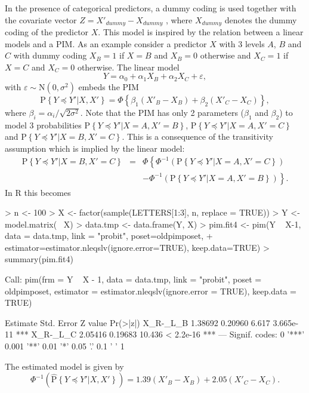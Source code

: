 \documentclass[12pt]{article}
\newcommand{\prob}[1]{\text{P}\left\{#1\right\}}
\newcommand{\hatprob}[1]{\hat{\text{P}}\left\{#1\right\}}
\newcommand{\leqs}{\preccurlyeq}
\begin{document}
In the presence of categorical predictors, a dummy coding is used together with the covariate vector $Z = X'_{dummy} - X_{dummy}$ , where $X_{dummy}$ denotes the dummy coding of the predictor $X$. This model is inspired by the relation between a linear models and a PIM. As an example consider a predictor $X$ with 3 levels $A$, $B$ and $C$ with dummy coding $X_{B} = 1$ if $X=B$ and $X_{B} = 0$ otherwise and $X_C = 1$ if $X = C$ and $X_C = 0$ otherwise. The linear model
\[
Y = \alpha_0 + \alpha_1 X_B + \alpha_2 X_C + \varepsilon,
\] 
with $\varepsilon \sim \text{N}(0,\sigma^2)$ embeds the PIM
\[
\prob{Y \leqs Y'| X, X'} = \Phi\left\{\beta_1 (X'_B - X_B) + \beta_2 (X'_C - X_C) \right\},
\]
where $\beta_i = \alpha_i/\sqrt{2 \sigma^2}$. Note that the PIM has only 2 parameters ($\beta_1$ and $\beta_2$) to model 3 probabilities $\prob{Y \leqs Y'| X = A, X' = B}$, $\prob{Y \leqs Y'| X = A, X' = C}$ and $\prob{Y \leqs Y'| X = B, X' = C}$. This is a consequence of the transitivity assumption which is implied by the linear model:
\begin{eqnarray*}
\prob{Y \leqs Y'| X = B, X' = C} &=& \Phi\left\{ \Phi^{-1} \left(\prob{Y \leqs Y'| X = A, X' = C} \right)  \right. \\
																 & & \left. 	- \Phi^{-1}\left(\prob{Y \leqs Y'| X = A, X' = B} \right) \right\}.
\end{eqnarray*}
In R this becomes
\begin{Schunk}
\begin{Sinput}
> n <- 100
> X <- factor(sample(LETTERS[1:3], n, replace = TRUE))
> Y <- model.matrix(~ X)%
> data.tmp <- data.frame(Y, X)
> pim.fit4 <- pim(Y ~ X-1, data = data.tmp, link = "probit", poset=oldpimposet, 
+ 								estimator=estimator.nleqslv(ignore.error=TRUE), keep.data=TRUE)
> summary(pim.fit4)
\end{Sinput}
\begin{Soutput}
Call:
pim(frm = Y ~ X - 1, data = data.tmp, link = "probit", poset = oldpimposet, 
    estimator = estimator.nleqslv(ignore.error = TRUE), keep.data = TRUE)

         Estimate Std. Error Z value  Pr(>|z|)    
X_R-_L_B  1.38692    0.20960   6.617 3.665e-11 ***
X_R-_L_C  2.05416    0.19683  10.436 < 2.2e-16 ***
---
Signif. codes:  0 '***' 0.001 '**' 0.01 '*' 0.05 '.' 0.1 ' ' 1 
\end{Soutput}
\end{Schunk}
The estimated model is given by
\[
\Phi^{-1}\left( \hatprob{Y \leqs Y'| X, X'} \right)= 1.39 (X'_B - X_B) + 2.05 (X'_C - X_C).
\]
\end{document}
